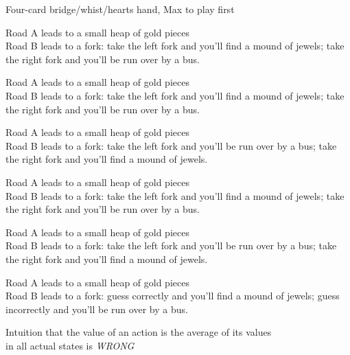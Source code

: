 \documentclass{article}
\begin{document}
\begin{huge}
Four-card bridge/whist/hearts hand, {\sc Max} to play first

\vspace*{0.1in}

\textwidth
{}


Road A leads to a small heap of gold pieces\\
Road B leads to a fork:\nl
   take the left fork and you'll find a mound of jewels;\nl
   take the right fork and you'll be run over by a bus.



Road A leads to a small heap of gold pieces\\
Road B leads to a fork:\nl
   take the left fork and you'll find a mound of jewels;\nl
   take the right fork and you'll be run over by a bus.

Road A leads to a small heap of gold pieces\\
Road B leads to a fork:\nl
   take the left fork and you'll  be run over by a bus;\nl
   take the right fork and you'll find a mound of jewels.


Road A leads to a small heap of gold pieces\\
Road B leads to a fork:\nl
   take the left fork and you'll find a mound of jewels;\nl
   take the right fork and you'll be run over by a bus.

Road A leads to a small heap of gold pieces\\
Road B leads to a fork:\nl
   take the left fork and you'll  be run over by a bus;\nl
   take the right fork and you'll find a mound of jewels.

Road A leads to a small heap of gold pieces\\
Road B leads to a fork:\nl
   guess correctly and you'll find a mound of jewels;\nl
   guess incorrectly and you'll be run over by a bus.



\mat{*} Intuition that the value of an action is the average of its values\\
in all actual states is \emph{WRONG}


\end{huge}
\end{document}
